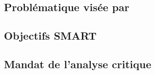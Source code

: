
\subsection{Problématique visée par \fedesante{}}
\label{sec:problematique-visee}

\subsection{Objectifs SMART}
\label{sec:objectifs-smart}

\subsection{Mandat de l'analyse critique}
\label{sec:mandat}
